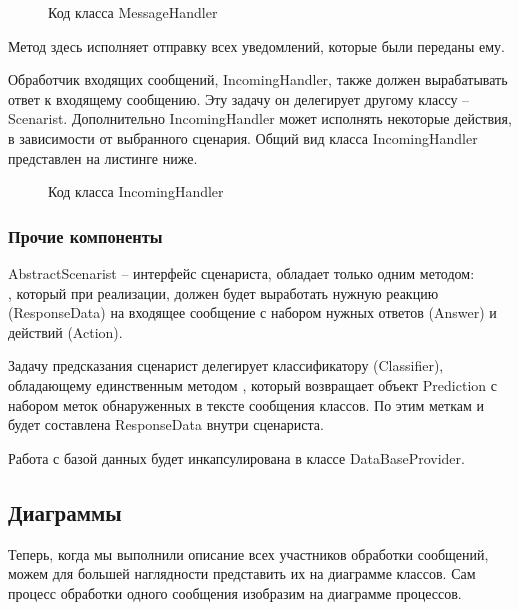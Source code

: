     \begin{figure}[H]
        \centering
        
        \caption{Код класса MessageHandler}
        \label{fig:message_handler}
    \end{figure}

    Метод  здесь исполняет отправку всех уведомлений,
    которые были переданы ему.

    Обработчик входящих сообщений, IncomingHandler, также должен вырабатывать 
    ответ к входящему сообщению. Эту задачу он делегирует другому 
    классу -- Scenarist. Дополнительно IncomingHandler может исполнять некоторые
    действия, в зависимости от выбранного сценария.
    Общий вид класса IncomingHandler представлен на листинге ниже.

    \begin{figure}[H]
        \centering
        
        \caption{Код класса IncomingHandler}
        \label{fig:incoming_handler}
    \end{figure}

    \subsubsection*{Прочие компоненты}
    AbstractScenarist -- интерфейс сценариста, обладает только одним методом:\\
    , который при реализации, должен
    будет выработать нужную реакцию (ResponseData) на входящее сообщение с
    набором нужных ответов (Answer) и действий (Action).

    Задачу предсказания сценарист делегирует классификатору (Classifier),
    обладающему единственным методом , который
    возвращает объект Prediction с набором меток обнаруженных в тексте сообщения
    классов. По этим меткам и будет составлена ResponseData внутри сценариста.

    Работа с базой данных будет инкапсулирована в классе DataBaseProvider.

    \subsection{Диаграммы}
    Теперь, когда мы выполнили описание всех участников обработки сообщений,
    можем для большей наглядности представить их на диаграмме классов.
    Сам процесс обработки одного сообщения изобразим на диаграмме процессов.

